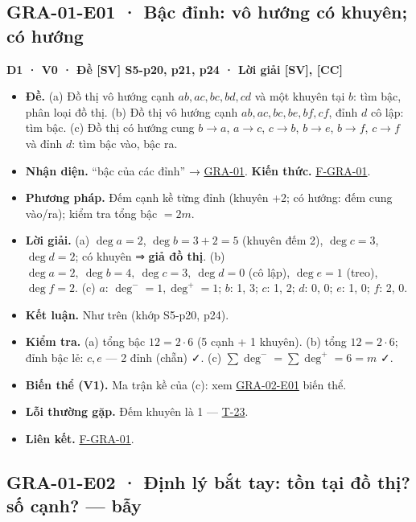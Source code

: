 \documentclass[
  10pt,
  twoside,openany]{book}
\providecommand{\tightlist}{%
  \setlength{\itemsep}{0pt}\setlength{\parskip}{0pt}}
\begin{document}
\hypertarget{GRA-01-E01}{%
\subsection{GRA-01-E01 · Bậc đỉnh: vô hướng có khuyên; có
hướng}\label{GRA-01-E01}}

\textbf{D1 · V0 · Đề {[}SV{]} S5-p20, p21, p24 · Lời giải {[}SV{]},
{[}CC{]}}

\begin{itemize}
\tightlist
\item
  \textbf{Đề.} (a) Đồ thị vô hướng cạnh \(ab, ac, bc, bd, cd\) và một
  khuyên tại \(b\): tìm bậc, phân loại đồ thị. (b) Đồ thị vô hướng cạnh
  \(ab, ac, bc, be, bf, cf\), đỉnh \(d\) cô lập: tìm bậc. (c) Đồ thị có
  hướng cung \(b\to a\), \(a\to c\), \(c\to b\), \(b\to e\), \(b\to f\),
  \(c\to f\) và đỉnh \(d\): tìm bậc vào, bậc ra.
\item
  \textbf{Nhận diện.} ``bậc của các đỉnh'' →
  \protect\hyperlink{GRA-01}{GRA-01}. \textbf{Kiến thức.}
  \protect\hyperlink{F-GRA-01}{F-GRA-01}.
\item
  \textbf{Phương pháp.} Đếm cạnh kề từng đỉnh (khuyên +2; có hướng: đếm
  cung vào/ra); kiểm tra tổng bậc \(=2m\).
\item
  \textbf{Lời giải.} (a) \(\deg a=2\), \(\deg b=3+2=5\) (khuyên đếm 2),
  \(\deg c=3\), \(\deg d=2\); có khuyên ⇒ \textbf{giả đồ thị}. (b)
  \(\deg a=2,\ \deg b=4,\ \deg c=3,\ \deg d=0\) (cô lập), \(\deg e=1\)
  (treo), \(\deg f=2\). (c) \(a\): \(\deg^-=1,\deg^+=1\); \(b\): 1, 3;
  \(c\): 1, 2; \(d\): 0, 0; \(e\): 1, 0; \(f\): 2, 0.
\item
  \textbf{Kết luận.} Như trên (khớp S5-p20, p24).
\item
  \textbf{Kiểm tra.} (a) tổng bậc \(12=2\cdot6\) (5 cạnh + 1 khuyên).
  (b) tổng \(12=2\cdot6\); đỉnh bậc lẻ: \(c,e\) --- 2 đỉnh (chẵn) ✓. (c)
  \(\sum\deg^-=\sum\deg^+=6=m\) ✓.
\item
  \textbf{Biến thể (V1).} Ma trận kề của (c): xem
  \protect\hyperlink{GRA-02-E01}{GRA-02-E01} biến thể.
\item
  \textbf{Lỗi thường gặp.} Đếm khuyên là 1 ---
  \protect\hyperlink{T-23}{T-23}.
\item
  \textbf{Liên kết.} \protect\hyperlink{F-GRA-01}{F-GRA-01}.
\end{itemize}

\hypertarget{GRA-01-E02}{%
\subsection{GRA-01-E02 · Định lý bắt tay: tồn tại đồ thị? số cạnh? ---
bẫy}\label{GRA-01-E02}}
\end{document}
